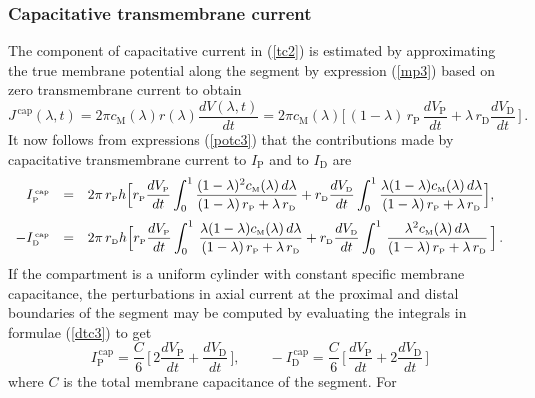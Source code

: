 \subsubsection{Capacitative transmembrane current}
The component of capacitative current in (\ref{tc2}) is estimated
by approximating the true membrane potential along the segment by
expression (\ref{mp3}) based on zero transmembrane current to
obtain
\begin{equation}\label{dtc2}
J^\mathrm{\,cap}(\lambda,t)=2\pi
c_\mathrm{M}(\lambda) r(\lambda) \frac{dV(\lambda,t)}{dt} = 2\pi
c_\mathrm{M}(\lambda) \Big[\,(1-\lambda)\,r_\mathrm{P}\,\frac{dV_\mathrm{P}}{dt}
+\lambda\,r_\mathrm{D}\frac{dV_\mathrm{D}}{dt}\,\Big]\,.
\end{equation}
It now follows from expressions (\ref{potc3}) that the
contributions  made by capacitative transmembrane current to
$I_\mathrm{P}$ and to $I_\mathrm{D}$ are
\begin{equation}\label{dtc3}
\begin{array}{rcl}
I^{\mbox{\tiny \,cap}}_{\mbox{\tiny P}} & = & 2\pi\, r_{\mbox{\tiny P}} h
\displaystyle\Big[r_{\mbox{\tiny P}}\frac{dV_{\mbox{\tiny P}}}{dt}
\int_0^1\frac{(1-\lambda)^2 c_{\mbox{\tiny M}}(\lambda)\,d\lambda}
{(1-\lambda)\,r_{\mbox{\tiny P}}+\lambda\,r_{\mbox{\tiny D}}}
+r_{\mbox{\tiny D}}\frac{dV_{\mbox{\tiny D}}}{dt}
\int_0^1 \frac{\lambda(1-\lambda)c_{\mbox{\tiny M}}(\lambda)\,d\lambda}
{(1-\lambda)\,r_{\mbox{\tiny P}}+\lambda\,r_{\mbox{\tiny D}}}\Big],\\[12pt]
-I^{\mbox{\tiny \,cap}}_{\mbox{\tiny D}} & = & 2\pi\, r_{\mbox{\tiny D}} h
\displaystyle\Big[r_{\mbox{\tiny P}}\frac{dV_{\mbox{\tiny P}}}{dt}\int_0^1\,
\frac{\lambda(1-\lambda)c_{\mbox{\tiny M}}(\lambda)\,d\lambda}
{(1-\lambda)\,r_{\mbox{\tiny P}}+\lambda\,r_{\mbox{\tiny D}}}+r_{\mbox{\tiny D}}
\frac{dV_{\mbox{\tiny D}}}{dt}\int_0^1\,\frac{\lambda^2
c_{\mbox{\tiny M}}(\lambda)\,d\lambda}
{(1-\lambda)\,r_{\mbox{\tiny P}}+\lambda\,r_{\mbox{\tiny D}}}\,\Big]\,.
\end{array}
\end{equation}
If the compartment is a uniform cylinder with constant specific
membrane capacitance, the perturbations in axial current at the
proximal and distal boundaries of the segment may be computed by
evaluating the integrals in formulae (\ref{dtc3}) to get
\begin{equation}\label{dtc4}
I^\mathrm{\,cap}_\mathrm{P} = \frac{C}{6}\,
\Big[\,2\frac{dV_\mathrm{P}}{dt}+\frac{dV_\mathrm{D}}{dt}\,\Big],
\qquad -I^\mathrm{\,cap}_\mathrm{D} = \frac{C}{6}\,
\Big[\,\frac{dV_\mathrm{P}}{dt}+2\frac{dV_\mathrm{D}}{dt} \,\Big]
\end{equation}
where $C$ is the total membrane capacitance of the segment. For
